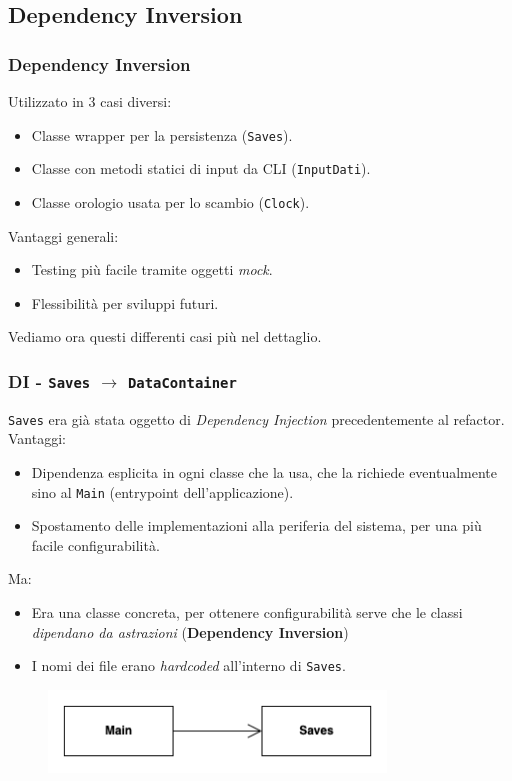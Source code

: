 \subsection{Dependency Inversion}
\begin{frame}
    \frametitle{Dependency Inversion}
    Utilizzato in 3 casi diversi:
    \begin{itemize}
        \item Classe wrapper per la persistenza (\texttt{Saves}).
        \item Classe con metodi statici di input da CLI (\texttt{InputDati}).
        \item Classe orologio usata per lo scambio (\texttt{Clock}).
    \end{itemize}
    Vantaggi generali:
    \begin{itemize}
        \item {\color{green}Testing più facile} tramite oggetti \emph{mock}.
        \item {\color{green}Flessibilità} per sviluppi futuri.
    \end{itemize}
    Vediamo ora questi differenti casi più nel dettaglio.
\end{frame}

\begin{frame}
    \frametitle{DI - \texttt{Saves} $\to$ \texttt{DataContainer}}
    \texttt{Saves} era già stata oggetto di \emph{Dependency Injection} precedentemente al refactor.
    {\color{green}Vantaggi}:
    \begin{itemize}
        \item {\color{green}Dipendenza esplicita} in ogni classe che la usa, che la richiede eventualmente sino al \texttt{Main}
        (entrypoint dell'applicazione).
        \item Spostamento delle implementazioni alla periferia del sistema, per una più {\color{green}facile configurabilità}.
    \end{itemize}

    Ma:
    \begin{itemize}
        \item Era una {\color{red}classe concreta}, per ottenere configurabilità serve che le classi \emph{dipendano da astrazioni}
        (\textbf{Dependency Inversion})
        \item I nomi dei file erano {\color{red}\emph{hardcoded}} all'interno di \texttt{Saves}.
    \end{itemize}
    \begin{figure}
        \includegraphics[width=0.8\textwidth]{img/dependencyInversion_before.png}
    \end{figure}
\end{frame}

